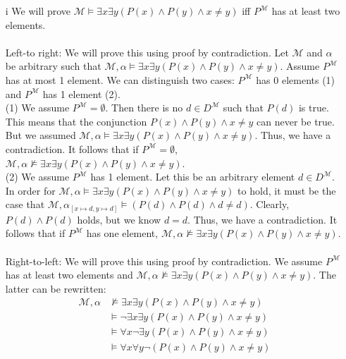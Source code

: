 \begin{enumerate}
    \item[i] We will prove $\mathcal{M} \vDash \exists x \exists y (P(x) \wedge P(y) \wedge x \neq y)$ iff $P^{\mathcal{M}}$ has at least two elements. \\\\
    Left-to right: We will prove this using proof by contradiction. Let $\mathcal{M}$ and  $\alpha$ be arbitrary such that $\mathcal{M}, \alpha \vDash \exists x \exists y (P(x) \wedge P(y) \wedge x \neq y)$. Assume $P^\mathcal{M}$ has at most 1 element. We can distinguish two cases: $P^\mathcal{M}$ has 0 elements (1) and $P^\mathcal{M}$ has 1 element (2). \\ 
    (1) We assume $P^\mathcal{M} = \emptyset$. Then there is no $d \in D^\mathcal{M}$ such that $P(d)$ is true. This means that the conjunction $P(x) \wedge P(y) \wedge x \neq y$ can never be true. But we assumed $\mathcal{M}, \alpha \vDash \exists x \exists y (P(x) \wedge P(y) \wedge x \neq y)$. Thus, we have a contradiction. It follows that if $P^\mathcal{M} = \emptyset$, $\mathcal{M}, \alpha \nvDash \exists x \exists y (P(x) \wedge P(y) \wedge x \neq y)$. \\
    (2) We assume $P^\mathcal{M}$ has 1 element. Let this be an arbitrary element $d \in D^\mathcal{M}$. In order for $\mathcal{M}, \alpha \vDash \exists x \exists y (P(x) \wedge P(y) \wedge x \neq y)$ to hold, it must be the case that $\mathcal{M}, \alpha_{[x \mapsto d, y \mapsto d]} \vDash (P(d) \wedge P(d) \wedge d \neq d)$. Clearly, $P(d) \wedge P(d)$ holds, but we know $d = d$. Thus, we have a contradiction. It follows that if $P^\mathcal{M}$ has one element, $\mathcal{M}, \alpha \nvDash \exists x \exists y (P(x) \wedge P(y) \wedge x \neq y)$. \\\\
    Right-to-left: We will prove this using proof by contradiction. We assume $P^\mathcal{M}$ has at least two elements and $\mathcal{M}, \alpha \nvDash \exists x \exists y (P(x) \wedge P(y) \wedge x \neq y)$. The latter can be rewritten:
    \begin{align*}
        \mathcal{M}, \alpha &\nvDash \exists x \exists y (P(x) \wedge P(y) \wedge x \neq y) \\
        &\vDash \neg \exists x \exists y (P(x) \wedge P(y) \wedge x \neq y) \\
        &\vDash \forall x \neg \exists y (P(x) \wedge P(y) \wedge x \neq y) \\
        &\vDash \forall x \forall y \neg (P(x) \wedge P(y) \wedge x \neq y) \\

\end{align*}
\end{enumerate}
